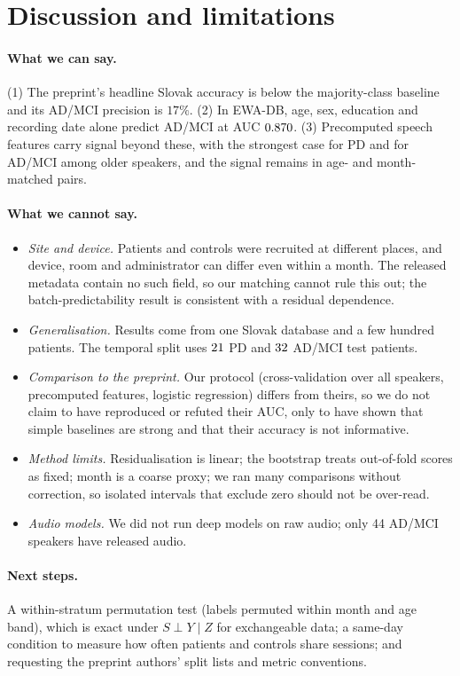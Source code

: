 \documentclass[10pt]{article}
\begin{document}
\section{Discussion and limitations}
\paragraph{What we can say.} (1) The preprint's headline Slovak accuracy is below the majority-class baseline and its AD/MCI precision is $17\%$. (2) In EWA-DB, age, sex, education and recording date alone predict AD/MCI at AUC $0.870$. (3) Precomputed speech features carry signal beyond these, with the strongest case for PD and for AD/MCI among older speakers, and the signal remains in age- and month-matched pairs.

\paragraph{What we cannot say.}
\begin{itemize}
\item \emph{Site and device.} Patients and controls were recruited at different places, and device, room and administrator can differ even within a month. The released metadata contain no such field, so our matching cannot rule this out; the batch-predictability result is consistent with a residual dependence.
\item \emph{Generalisation.} Results come from one Slovak database and a few hundred patients. The temporal split uses $21$ PD and $32$ AD/MCI test patients.
\item \emph{Comparison to the preprint.} Our protocol (cross-validation over all speakers, precomputed features, logistic regression) differs from theirs, so we do not claim to have reproduced or refuted their AUC, only to have shown that simple baselines are strong and that their accuracy is not informative.
\item \emph{Method limits.} Residualisation is linear; the bootstrap treats out-of-fold scores as fixed; month is a coarse proxy; we ran many comparisons without correction, so isolated intervals that exclude zero should not be over-read.
\item \emph{Audio models.} We did not run deep models on raw audio; only 44 AD/MCI speakers have released audio.
\end{itemize}

\paragraph{Next steps.} A within-stratum permutation test (labels permuted within month and age band), which is exact under $S\perp Y\mid Z$ for exchangeable data; a same-day condition to measure how often patients and controls share sessions; and requesting the preprint authors' split lists and metric conventions.
\end{document}
